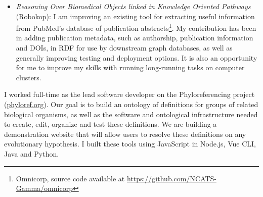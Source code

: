 \begin{itemize}
\item \textit{Reasoning Over Biomedical Objects linked in Knowledge Oriented Pathways} (Robokop): I am improving an existing tool for extracting useful information from PubMed's database of publication abstracts\footnote{Omnicorp, source code available at \url{https://github.com/NCATS-Gamma/omnicorp}}. My contribution has been in adding publication metadata, such as authorship, publication information and DOIs, in RDF for use by downstream graph databases, as well as generally improving testing and deployment options. It is also an opportunity for me to improve my skills with running long-running tasks on computer clusters.


\begin{products}


\end{products}

\end{itemize}


I worked full-time as the lead software developer on the Phyloreferencing project (\href{http://phyloref.org}{phyloref.org}). Our goal is to build an ontology of definitions for groups of related biological organisms, as well as the software and ontological infrastructure needed to create, edit, organize and test these definitions. We are building a demonstration website that will allow users to resolve these definitions on any evolutionary hypothesis. I built these tools using JavaScript in Node.js, Vue CLI, Java and Python.

